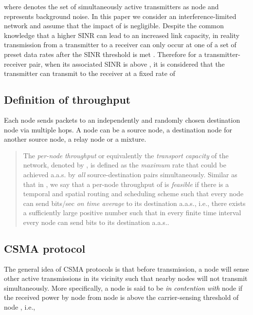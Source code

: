 \documentclass[english]{IEEEtran}
\theoremstyle{plain}
\theoremstyle{plain}
\theoremstyle{plain}
\theoremstyle{remark}
\begin{document}
where  denotes the set of simultaneously
active transmitters as node  and  represents background
noise. In this paper we consider an interference-limited network and
assume that the impact of  is negligible. Despite the common
knowledge that a higher SINR can lead to an increased link capacity,
in reality transmission from a transmitter to a receiver can only
occur at one of a set of preset data rates after the SINR threshold
is met \cite{Kim08Understanding,Lin07Interplay}. Therefore for a
transmitter-receiver pair, when its associated SINR is above ,
it is considered that the transmitter can transmit to the receiver
at a fixed rate of 




\subsection{Definition of throughput\label{sub:Definition-of-throughput}}

Each node sends packets to an independently and randomly chosen destination
node via multiple hops. A node can be a source node, a destination
node for another source node, a relay node or a mixture. 
\begin{quotation}
The \emph{per-node} \emph{throughput} or equivalently the \emph{transport
capacity} of the network, denoted by , is
defined as the \emph{maximum} rate that could be achieved a.a.s. by
\emph{all} source-destination pairs simultaneously. Similar as that
in \cite{Gupta00Capacity}, we say that a per-node throughput of 
is \emph{feasible} if there is a temporal and spatial routing and
scheduling scheme such that every node can send 
bits/sec \emph{on time average} to its destination a.a.s., i.e., there
exists a sufficiently large positive number  such that in every
finite time interval  every
node can send  bits to its destination
a.a.s.. 
\end{quotation}

\subsection{CSMA protocol}

The general idea of CSMA protocols is that before transmission, a
node will sense other active transmissions in its vicinity such that
nearby nodes will not transmit simultaneously. More specifically,
a node  is said to be \emph{in contention with} node  if the
received power by node  from node  is above the carrier-sensing
threshold  of node , i.e., 
\end{document}
